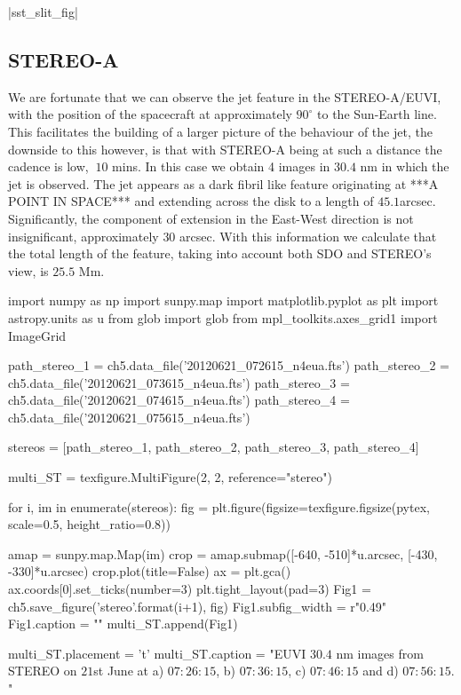 \py[chapter5]|sst_slit_fig|



\subsection{STEREO-A}
We are fortunate that we can observe the jet feature in the STEREO-A/EUVI, with the position of the spacecraft at approximately $90^\circ$ to the Sun-Earth line.
This facilitates the building of a larger picture of the behaviour of the jet, the downside to this however, is that with STEREO-A being at such a distance the cadence is low, $~10$ mins.
In this case we obtain 4 images in $30.4$ nm in which the jet is observed.
The jet appears as a dark fibril like feature originating at ***A POINT IN SPACE*** and extending across the disk to a length of $45.1$arcsec.
Significantly, the component of extension in the East-West direction is not insignificant, approximately $30$ arcsec.
With this information we calculate that the total length of the feature, taking into account both SDO and STEREO's view, is $25.5$ Mm.



\begin{pycode}[chapter5]
import numpy as np
import sunpy.map
import matplotlib.pyplot as plt
import astropy.units as u
from glob import glob
from mpl_toolkits.axes_grid1 import ImageGrid

path_stereo_1 = ch5.data_file('20120621_072615_n4eua.fts')
path_stereo_2 = ch5.data_file('20120621_073615_n4eua.fts')
path_stereo_3 = ch5.data_file('20120621_074615_n4eua.fts')
path_stereo_4 = ch5.data_file('20120621_075615_n4eua.fts')

stereos = [path_stereo_1, path_stereo_2, path_stereo_3, path_stereo_4]


multi_ST = texfigure.MultiFigure(2, 2, reference="stereo")


for i, im in enumerate(stereos):
	fig = plt.figure(figsize=texfigure.figsize(pytex, scale=0.5, height_ratio=0.8))
	
	amap = sunpy.map.Map(im)
	crop = amap.submap([-640, -510]*u.arcsec, [-430, -330]*u.arcsec)
	crop.plot(title=False)
	ax = plt.gca()
	ax.coords[0].set_ticks(number=3)
	plt.tight_layout(pad=3)
	Fig1 = ch5.save_figure('stereo{}'.format(i+1), fig)
	Fig1.subfig_width = r"0.49\textwidth"
	Fig1.caption = ""
	multi_ST.append(Fig1)

multi_ST.placement = 't'
multi_ST.caption = "EUVI $30.4$ nm images from STEREO on $21$st June at a) $07:26:15$, b) $07:36:15$, c) $07:46:15$ and d) $07:56:15$. "
\end{pycode}

